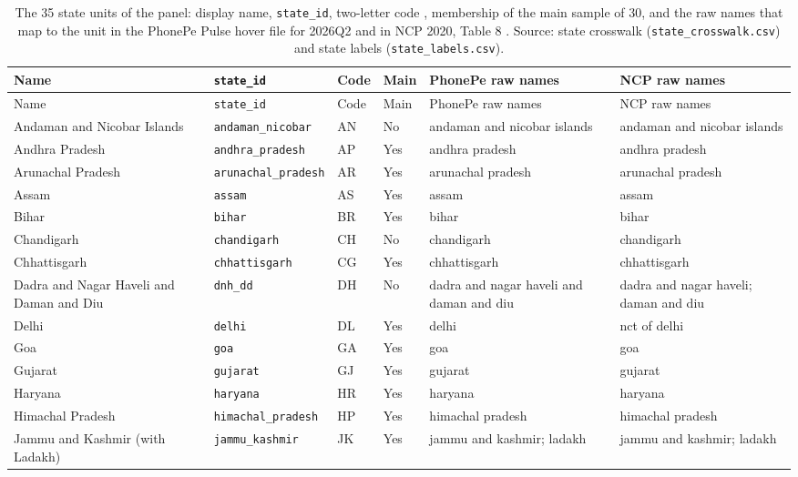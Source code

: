 \begin{longtable}{@{}>{\raggedright\arraybackslash}p{2.8cm} l l l >{\raggedright\arraybackslash}p{2.8cm} >{\raggedright\arraybackslash}p{2.8cm}@{}}
\caption{The 35 state units of the panel: display name, \texttt{state\_id}, two-letter code \citep{iso3166_2_in}, membership of the main sample of 30, and the raw names that map to the unit in the PhonePe Pulse hover file for 2026Q2 \citep{phonepe_pulse} and in NCP 2020, Table 8 \citep{ncp2020}. Source: state crosswalk (\texttt{state\_crosswalk.csv}) and state labels (\texttt{state\_labels.csv}).}\label{tab:units}\\
\toprule
Name & \texttt{state\_id} & Code & Main & PhonePe raw names & NCP raw names \\
\midrule
\endfirsthead
\toprule
Name & \texttt{state\_id} & Code & Main & PhonePe raw names & NCP raw names \\
\midrule
\endhead
Andaman and Nicobar Islands & \texttt{andaman\_nicobar} & AN & No & andaman and nicobar islands & andaman and nicobar islands \\
Andhra Pradesh & \texttt{andhra\_pradesh} & AP & Yes & andhra pradesh & andhra pradesh \\
Arunachal Pradesh & \texttt{arunachal\_pradesh} & AR & Yes & arunachal pradesh & arunachal pradesh \\
Assam & \texttt{assam} & AS & Yes & assam & assam \\
Bihar & \texttt{bihar} & BR & Yes & bihar & bihar \\
Chandigarh & \texttt{chandigarh} & CH & No & chandigarh & chandigarh \\
Chhattisgarh & \texttt{chhattisgarh} & CG & Yes & chhattisgarh & chhattisgarh \\
Dadra and Nagar Haveli and Daman and Diu & \texttt{dnh\_dd} & DH & No & dadra and nagar haveli and daman and diu & dadra and nagar haveli; daman and diu \\
Delhi & \texttt{delhi} & DL & Yes & delhi & nct of delhi \\
Goa & \texttt{goa} & GA & Yes & goa & goa \\
Gujarat & \texttt{gujarat} & GJ & Yes & gujarat & gujarat \\
Haryana & \texttt{haryana} & HR & Yes & haryana & haryana \\
Himachal Pradesh & \texttt{himachal\_pradesh} & HP & Yes & himachal pradesh & himachal pradesh \\
Jammu and Kashmir (with Ladakh) & \texttt{jammu\_kashmir} & JK & Yes & jammu and kashmir; ladakh & jammu and kashmir; ladakh \\

\end{longtable}
